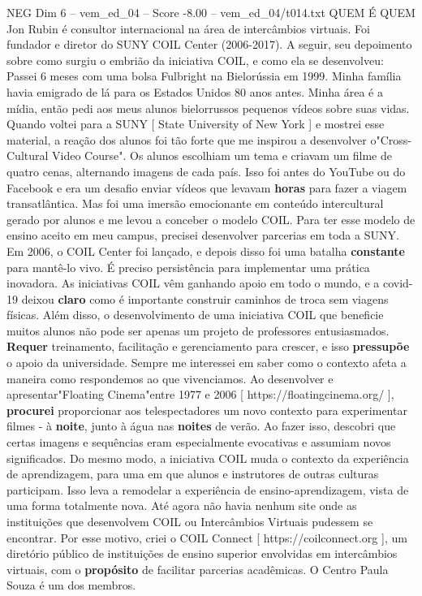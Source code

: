 \begin{textsample}{NEG Dim 6 – vem\_ed\_04 – Score -8.00 – vem\_ed\_04/t014.txt}  \label{ex:f6_neg_022}
QUEM É QUEM Jon Rubin é consultor internacional na área de intercâmbios virtuais.
Foi fundador e diretor do SUNY COIL Center (2006-2017).
A seguir, seu depoimento sobre como surgiu o embrião da iniciativa COIL, e como ela se desenvolveu: Passei 6 meses com uma bolsa Fulbright na Bielorússia em 1999.
Minha família havia emigrado de lá para os Estados Unidos 80 anos antes.
Minha área é a mídia, então pedi aos meus alunos bielorrussos pequenos vídeos sobre suas vidas.
Quando voltei para a SUNY [ State University of New York ] e mostrei esse material, a reação dos alunos foi tão forte que me inspirou a desenvolver o"Cross-Cultural Video Course".
Os alunos escolhiam um tema e criavam um filme de quatro cenas, alternando imagens de cada país.
Isso foi antes do YouTube ou do Facebook e era um desafio enviar vídeos que levavam \textbf{horas} para fazer a viagem transatlântica.
Mas foi uma imersão emocionante em conteúdo intercultural gerado por alunos e me levou a conceber o modelo COIL.
Para ter esse modelo de ensino aceito em meu campus, precisei desenvolver parcerias em toda a SUNY.
Em 2006, o COIL Center foi lançado, e depois disso foi uma batalha \textbf{constante} para mantê-lo vivo.
É preciso persistência para implementar uma prática inovadora.
As iniciativas COIL vêm ganhando apoio em todo o mundo, e a covid-19 deixou \textbf{claro} como é importante construir caminhos de troca sem viagens físicas.
Além disso, o desenvolvimento de uma iniciativa COIL que beneficie muitos alunos não pode ser apenas um projeto de professores entusiasmados. \textbf{Requer} treinamento, facilitação e gerenciamento para crescer, e isso \textbf{pressupõe} o apoio da universidade.
Sempre me interessei em saber como o contexto afeta a maneira como respondemos ao que vivenciamos.
Ao desenvolver e apresentar"Floating Cinema"entre 1977 e 2006 [ https://floatingcinema.org/ ], \textbf{procurei} proporcionar aos telespectadores um novo contexto para experimentar filmes - à \textbf{noite}, junto à água nas \textbf{noites} de verão.
Ao fazer isso, descobri que certas imagens e sequências eram especialmente evocativas e assumiam novos significados.
Do mesmo modo, a iniciativa COIL muda o contexto da experiência de aprendizagem, para uma em que alunos e instrutores de outras culturas participam.
Isso leva a remodelar a experiência de ensino-aprendizagem, vista de uma forma totalmente nova.
Até agora não havia nenhum site onde as instituições que desenvolvem COIL ou Intercâmbios Virtuais pudessem se encontrar.
Por esse motivo, criei o COIL Connect [ https://coilconnect.org ], um diretório público de instituições de ensino superior envolvidas em intercâmbios virtuais, com o \textbf{propósito} de facilitar parcerias acadêmicas.
O Centro Paula Souza é um dos membros.

\end{textsample}
